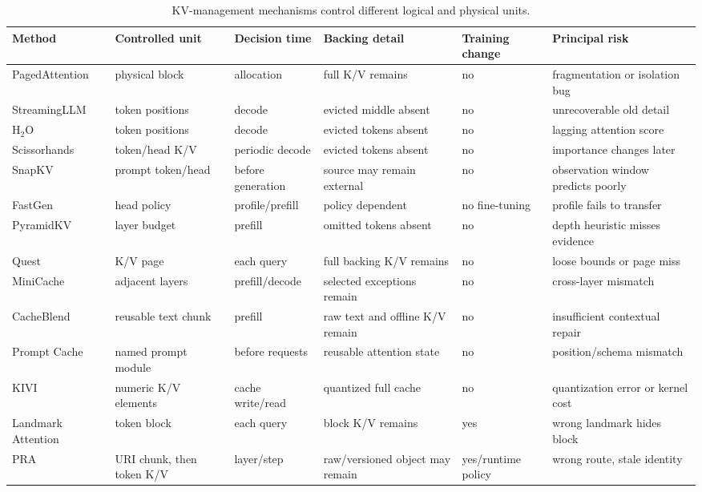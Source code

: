 \begin{table}[htbp]
\centering\scriptsize
\caption{KV-management mechanisms control different logical and physical units.}
\begin{tabular}{>{\raggedright\arraybackslash}p{2.5cm}>{\raggedright\arraybackslash}p{2.0cm}>{\raggedright\arraybackslash}p{1.9cm}>{\raggedright\arraybackslash}p{2.4cm}>{\raggedright\arraybackslash}p{1.8cm}>{\raggedright\arraybackslash}p{2.8cm}}
\toprule
Method & Controlled unit & Decision time & Backing detail & Training change & Principal risk \\\midrule
PagedAttention & physical block & allocation & full K/V remains & no & fragmentation or isolation bug \\
StreamingLLM & token positions & decode & evicted middle absent & no & unrecoverable old detail \\
H$_2$O & token positions & decode & evicted tokens absent & no & lagging attention score \\
Scissorhands & token/head K/V & periodic decode & evicted tokens absent & no & importance changes later \\
SnapKV & prompt token/head & before generation & source may remain external & no & observation window predicts poorly \\
FastGen & head policy & profile/prefill & policy dependent & no fine-tuning & profile fails to transfer \\
PyramidKV & layer budget & prefill & omitted tokens absent & no & depth heuristic misses evidence \\
Quest & K/V page & each query & full backing K/V remains & no & loose bounds or page miss \\
MiniCache & adjacent layers & prefill/decode & selected exceptions remain & no & cross-layer mismatch \\
CacheBlend & reusable text chunk & prefill & raw text and offline K/V remain & no & insufficient contextual repair \\
Prompt Cache & named prompt module & before requests & reusable attention state & no & position/schema mismatch \\
KIVI & numeric K/V elements & cache write/read & quantized full cache & no & quantization error or kernel cost \\
Landmark Attention & token block & each query & block K/V remains & yes & wrong landmark hides block \\
PRA & URI chunk, then token K/V & layer/step & raw/versioned object may remain & yes/runtime policy & wrong route, stale identity \\
\bottomrule
\end{tabular}
\end{table}

